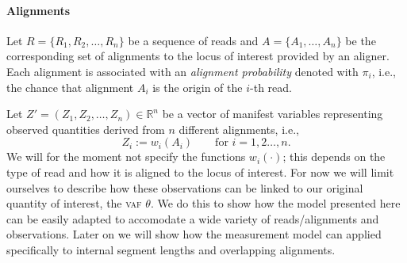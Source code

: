 \documentclass[12pt,a4paper]{article}
\numberwithin{equation}{section}
\begin{document}
\paragraph{Alignments}
Let $R = \{R_1, R_2, \dots, R_n\}$ be a sequence of reads and $A = \{A_1, \dots, A_n\}$ be the corresponding set of alignments to the locus of interest provided by an aligner. Each alignment is associated with an \emph{alignment probability} denoted with $\pi_i$, i.e., the chance that alignment $A_i$ is the origin of the $i$-th read. 

Let $Z' = \left(Z_1, Z_2, \dots, Z_n \right) \in \mathds{R}^n$ be a vector of manifest variables representing observed quantities derived from $n$ different alignments, i.e., 
\begin{equation}
	Z_i := w_i\left(A_i\right) \qquad \text{for }i = 1,2\dots,n. 
\end{equation}
We will for the moment not specify the functions $w_i(\cdot)$; this depends on the type of read and how it is aligned to the locus of interest. For now we will limit ourselves to describe how these observations can be linked to our original quantity of interest, the \textsc{vaf} $\theta$. We do this to show how the model presented here can be easily adapted to accomodate a wide variety of reads/alignments and observations. Later on we will show how the measurement model can applied specifically to internal segment lengths and overlapping alignments. 
\end{document}
